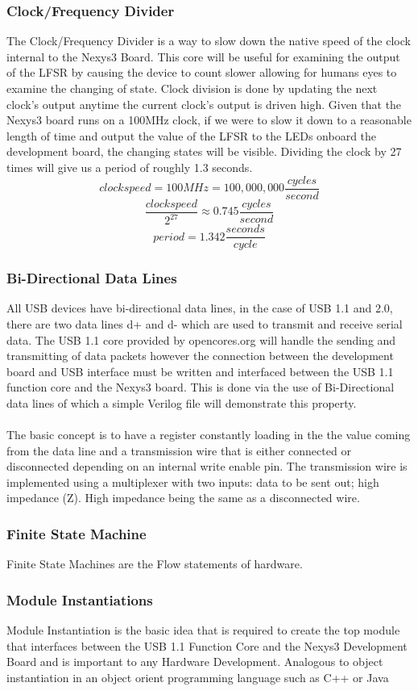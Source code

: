 \documentclass[10pt,a4paper]{article}
\begin{document}
\subsubsection{Clock/Frequency Divider}
The Clock/Frequency Divider is a way to slow down the native speed of the clock internal to the Nexys3 Board. This core will be useful for examining the output of the LFSR by causing the device to count slower allowing for humans eyes to examine the changing of state. Clock division is done by updating the next clock's output anytime the current clock's output is driven high. Given that the Nexys3 board runs on a 100MHz clock, if we were to slow it down to a reasonable length of time and output the value of the LFSR to the LEDs onboard the development board, the changing states will be visible. Dividing the clock by 27 times will give us a period of roughly 1.3 seconds.
$$ clock speed = 100MHz = 100,000,000 \frac{cycles}{second} $$
$$ \frac{clock speed}{2^{27}} \approx 0.745 \frac{cycles}{second} $$
$$ period = 1.342 \frac{seconds}{cycle} $$
\subsubsection{Bi-Directional Data Lines} 
All USB devices have bi-directional data lines, in the case of USB 1.1 and 2.0, there are two data lines d+ and d- which are used to transmit and receive serial data. The USB 1.1 core provided by opencores.org will handle the sending and transmitting of data packets however the connection between the development board and USB interface must be written and interfaced between the USB 1.1 function core and the Nexys3 board. This is done via the use of Bi-Directional data lines of which a simple Verilog file will demonstrate this property. \\ \\
The basic concept is to have a register constantly loading in the the value coming from the data line and a transmission wire that is either connected or disconnected depending on an internal write enable pin. The transmission wire is implemented using a multiplexer with two inputs: data to be sent out; high impedance (Z). High impedance being the same as a disconnected wire.
\subsubsection{Finite State Machine} 
Finite State Machines are the Flow statements of hardware.
\subsubsection{Module Instantiations} 
Module Instantiation is the basic idea that is required to create the top module that interfaces between the USB 1.1 Function Core and the Nexys3 Development Board and is important to any Hardware Development. Analogous to object instantiation in an object orient programming language such as C++ or Java
\end{document}

